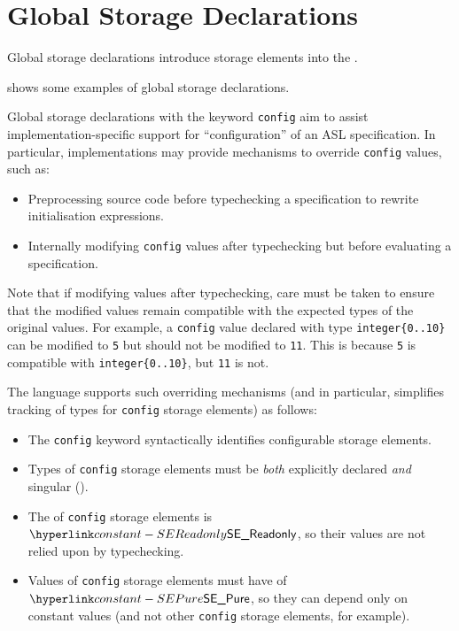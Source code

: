 \chapter{Global Storage Declarations\label{chap:GlobalStorageDeclarations}}

Global storage declarations introduce storage elements into the \globalstaticenvironmentterm.

 shows some examples of global storage declarations.

\ChapterOutline

Global storage declarations with the keyword \texttt{config} aim to assist implementation-specific support for ``configuration'' of an ASL specification.
In particular, implementations may provide mechanisms to override \texttt{config} values, such as:
\begin{itemize}
  \item Preprocessing source code before typechecking a specification to rewrite initialisation expressions.
  \item Internally modifying \texttt{config} values after typechecking but before evaluating a specification.
\end{itemize}
Note that if modifying values after typechecking, care must be taken to ensure that the modified values remain compatible with the expected types of the original values.
For example, a \texttt{config} value declared with type \verb|integer{0..10}| can be modified to \texttt{5} but should not be modified to \texttt{11}.
This is because \texttt{5} is compatible with \verb|integer{0..10}|, but \texttt{11} is not.

The language supports such overriding mechanisms (and in particular, simplifies tracking of types for \texttt{config} storage elements) as follows:
\begin{itemize}
  \item The \texttt{config} keyword syntactically identifies configurable storage elements.
  \item Types of \texttt{config} storage elements must be \emph{both} explicitly declared \emph{and} singular ().
  \item The \purity{} of \texttt{config} storage elements is $\SEReadonly$, so their values are not relied upon by typechecking.
  \item Values of \texttt{config} storage elements must have \purity{} of $\SEPure$, so they can depend only on constant values (and not other \texttt{config} storage elements, for example).
\end{itemize}

